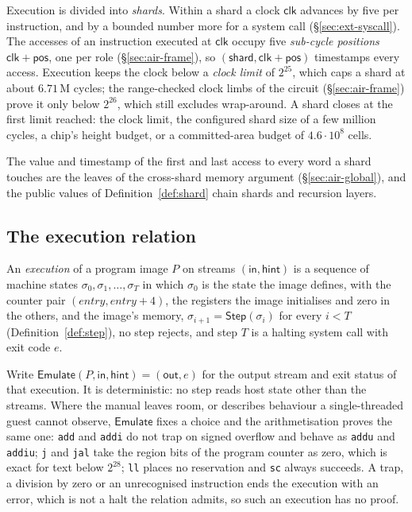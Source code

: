 Execution is divided into \emph{shards}. Within a shard a clock $\mathsf{clk}$ advances by five per instruction, and by a bounded number more for a system call (\S\ref{sec:ext-syscall}). The accesses of an instruction executed at $\mathsf{clk}$ occupy five \emph{sub-cycle positions} $\mathsf{clk}+\mathsf{pos}$, one per role (\S\ref{sec:air-frame}), so $(\mathsf{shard}, \mathsf{clk} + \mathsf{pos})$ timestamps every access. Execution keeps the clock below a \emph{clock limit} of $2^{25}$, which caps a shard at about $6.71$\,M cycles; the range-checked clock limbs of the circuit (\S\ref{sec:air-frame}) prove it only below $2^{26}$, which still excludes wrap-around. A shard closes at the first limit reached: the clock limit, the configured shard size of a few million cycles, a chip's height budget, or a committed-area budget of $4.6\cdot10^{8}$ cells.

The value and timestamp of the first and last access to every word a shard touches are the leaves of the cross-shard memory argument (\S\ref{sec:air-global}), and the public values of Definition~\ref{def:shard} chain shards and recursion layers.

\subsection{The execution relation}
\label{sec:isa-emulator}

\begin{definition}[Execution]
\label{def:execution}
An \emph{execution} of a program image $P$ on streams $(\mathsf{in}, \mathsf{hint})$ is a sequence of machine states $\sigma_0, \sigma_1, \ldots, \sigma_T$ in which $\sigma_0$ is the state the image defines, with the counter pair $(\mathit{entry}, \mathit{entry}+4)$, the registers the image initialises and zero in the others, and the image's memory, $\sigma_{i+1} = \mathsf{Step}(\sigma_i)$ for every $i < T$ (Definition~\ref{def:step}), no step rejects, and step $T$ is a halting system call with exit code $e$.
\end{definition}

Write $\mathsf{Emulate}(P, \mathsf{in}, \mathsf{hint}) = (\mathsf{out}, e)$ for the output stream and exit status of that execution. It is deterministic: no step reads host state other than the streams. Where the manual leaves room, or describes behaviour a single-threaded guest cannot observe, $\mathsf{Emulate}$ fixes a choice and the arithmetisation proves the same one: \texttt{add} and \texttt{addi} do not trap on signed overflow and behave as \texttt{addu} and \texttt{addiu}; \texttt{j} and \texttt{jal} take the region bits of the program counter as zero, which is exact for text below $2^{28}$; \texttt{ll} places no reservation and \texttt{sc} always succeeds. A trap, a division by zero or an unrecognised instruction ends the execution with an error, which is not a halt the relation admits, so such an execution has no proof.

